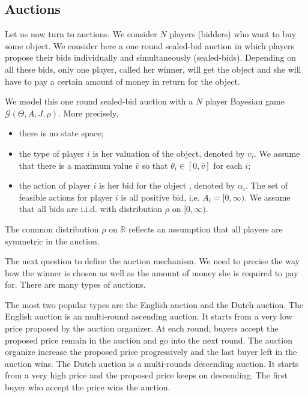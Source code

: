 \subsection{Auctions}

Let us now turn to auctions. We consider $N$ players (bidders) who want to buy some object. We consider here a one round sealed-bid auction in which players propose their bids individually and simultaneously (sealed-bids). Depending on all these bids, only one player, called her winner, will get the object and she will have to pay a certain amount of money in return for the object.

We model this one round sealed-bid auction with a $N$ player Bayesian game $\mathcal{G}(\Theta, A, J, \rho)$. More precisely, 
\begin{itemize}
	\item  there is no state space;
	\item  the type of player $i$ is her valuation of the object, denoted by $v_i$. We assume that there is a maximum value $\bar v$ so that $\theta_i \in [0, \bar{v}]$ for each $i$;
	\item  the action of player $i$ is her bid for the object , denoted by $\alpha_i $. The set of feasible actions for player $i$ is all positive bid, i.e. $A_i = [0,\infty)$. 	We assume that all bids are i.i.d. with distribution $\rho$ on $[0,\infty)$. 	
\end{itemize} 

\begin{remark}
	The common distribution $\rho$ on $\mathbb{R}$ reflects an assumption that all players are symmetric in the auction.
\end{remark}

The next question to define the auction mechanism. We need to precise the way how the winner is chosen as well as the amount of money she is required to pay for. There are many types of auctions. 

The most two popular types are the English auction and the Dutch auction. The English auction is an multi-round ascending auction.  It starts from a very low price proposed by the auction organizer. At each round, buyers accept the proposed price remain in the auction and go into the next round. The auction organize increase the proposed price progressively and the last buyer left in the auction wins. The Dutch auction is a multi-rounds descending auction. It starts from a very high price and the proposed price keeps on descending. The first buyer who accept the price wins the auction. 

